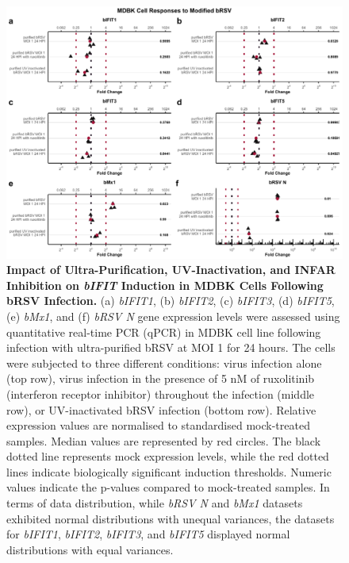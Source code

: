 \begin{figure}
    \centering
    \includegraphics[width=1\linewidth]{07. Chapter 2/Figs/02. Induction/04. mdbk_brsv_uv_roxo.pdf}
    \caption[Impact of Ultra-Purification, UV-Inactivation, and INFAR Inhibition on \textit{bIFIT} Induction in MDBK Cells Following bRSV Infection.]{\textbf{Impact of Ultra-Purification, UV-Inactivation, and INFAR Inhibition on \textit{bIFIT} Induction in MDBK Cells Following bRSV Infection.} (a) \textit{bIFIT1}, (b) \textit{bIFIT2}, (c) \textit{bIFIT3}, (d) \textit{bIFIT5}, (e) \textit{bMx1}, and (f) \textit{bRSV N} gene expression levels were assessed using quantitative real-time PCR (qPCR) in MDBK cell line following infection with ultra-purified bRSV at MOI 1 for 24 hours. The cells were subjected to three different conditions: virus infection alone (top row), virus infection in the presence of 5 nM of ruxolitinib (interferon receptor inhibitor) throughout the infection (middle row), or UV-inactivated bRSV infection (bottom row). Relative expression values are normalised to standardised mock-treated samples. Median values are represented by red circles. The black dotted line represents mock expression levels, while the red dotted lines indicate biologically significant induction thresholds. Numeric values indicate the p-values compared to mock-treated samples. In terms of data distribution, while \textit{bRSV N} and \textit{bMx1} datasets exhibited normal distributions with unequal variances, the datasets for \textit{bIFIT1}, \textit{bIFIT2}, \textit{bIFIT3}, and \textit{bIFIT5} displayed normal distributions with equal variances.}
    \label{fig:The effect of ultra-purification, UV-inactivation and INFR inhibition on hIFIT induction following hRSV infection in MDBK}
\end{figure}

